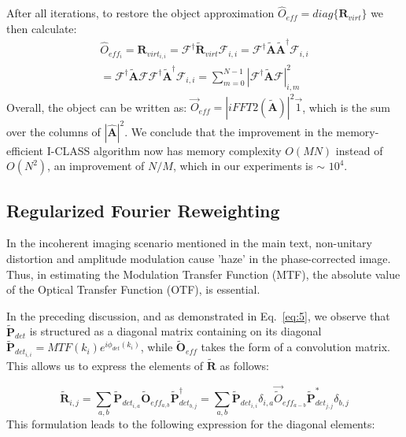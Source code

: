 \documentclass[pdflatex,sn-mathphys-num,Numbered]{sn-jnl}%
\theoremstyle{thmstyleone}%
\theoremstyle{thmstyletwo}%
\theoremstyle{thmstylethree}%
\begin{document}
After all iterations, to restore the object approximation $\hat{O}_{eff}=diag\{\textbf{R}_{virt}\}$ we then calculate:
\begin{align}
\label{eq:14}  \tag{S14}
&\hat{O}_{eff_i}=\textbf{R}_{virt_{i,i}}=\mathcal{F}^{\dagger}\tilde{\textbf{R}}_{virt}\mathcal{F}_{i,i}=\mathcal{F}^{\dagger}\tilde{\textbf{A}}\tilde{\textbf{A}}^\dagger\mathcal{F}_{i,i} &\\ 
&= \mathcal{F}^{\dagger}\tilde{\textbf{A}}\mathcal{F}\mathcal{F}^{\dagger}\tilde{\textbf{A}}^\dagger\mathcal{F}_{i,i} \nonumber = \sum^{N-1}_{m=0}|\mathcal{F}^{\dagger}\tilde{\textbf{A}}\mathcal{F}|^2_{i,m} &
\end{align}
Overall, the object can be written as: $\vec{{O}}_{eff} =|iFFT2(\tilde{\textbf{A}})|^2\vec{1}$, which is the sum over the columns of $|{\hat{\textbf{A}}}|^2$.
We conclude that the improvement in the memory-efficient I-CLASS algorithm now has memory complexity $O(MN)$ instead of $O(N^2)$, an improvement of $N/M$, which in our experiments is $\sim$ $10^4$.







\subsection*{Regularized Fourier Reweighting}

In the incoherent imaging scenario mentioned in the main text, non-unitary distortion and amplitude modulation cause 'haze' in the phase-corrected image. Thus, in estimating the Modulation Transfer Function (MTF), the absolute value of the Optical Transfer Function (OTF), is essential. 

In the preceding discussion, and as demonstrated in Eq.~\ref{eq:5}, we observe that ${\tilde{\textbf{P}}_{det}}$ is structured as a diagonal matrix containing on its diagonal  ${\tilde{\textbf{P}}_{det_{i,i}}}=MTF(k_i)e^{i\phi_{det}(k_i)}$, while ${\tilde{\textbf{O}}_{eff}}$ takes the form of a convolution matrix. This allows us to express the elements of $\tilde{\textbf{R}}$ as follows:

\begin{equation}
\tilde{\textbf{R}}_{i,j} = \sum_{a,b}{\tilde{\textbf{P}}_{det_{i,a}}} \tilde{\textbf{O}}_{eff_{a,b}}{\tilde{\textbf{P}}^{\dagger}_{det_{b,j}}}=\sum_{a,b}{\tilde{\textbf{P}}_{det_{i,i}}} \delta_{i,a} \vec{\tilde{O}}_{eff_{a-b}}{\tilde{\textbf{P}}^*_{det_{j,j}}} \delta_{b,j}
\label{eq:15}  \tag{S15}
\end{equation}
This formulation leads to the following expression for the diagonal elements:
\end{document}
